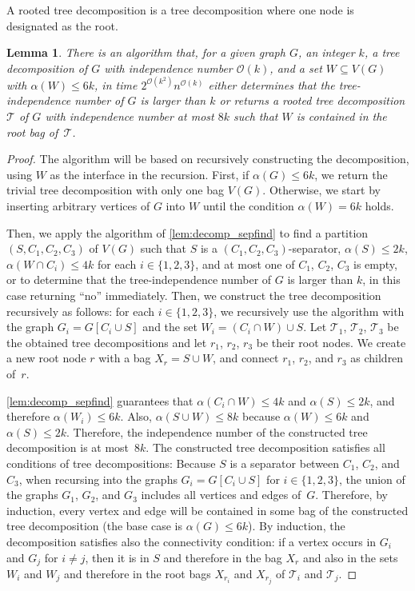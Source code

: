 \documentclass[11pt]{article}
\newtheorem{lemma}{Lemma}[section]
\theoremstyle{definition}
\newcommand{\td}{\mathcal{T}}
\newcommand{\OO}{\mathcal{O}}
\begin{document}
A rooted tree decomposition is a tree decomposition where one node is designated as the root.

\begin{lemma}
\label{lem:maindecompalg}
There is an algorithm that, for a given graph $G$, an integer $k$, a tree decomposition of $G$ with independence number $\OO(k)$, and a set $W \subseteq V(G)$ with $\alpha(W) \le 6k$, in time $2^{\OO(k^2)} n^{\OO(k)}$ either determines that the tree-independence number of $G$ is larger than $k$ or returns a rooted tree decomposition $\td$ of $G$ with independence number at most $8k$ such that $W$ is contained in the root bag of~$\td$.
\end{lemma}
\begin{proof}
The algorithm will be based on recursively constructing the decomposition, using $W$ as the interface in the recursion.
First, if $\alpha(G) \le 6k$, we return the trivial tree decomposition with only one bag $V(G)$.
Otherwise, we start by inserting arbitrary vertices of $G$ into $W$ until the condition $\alpha(W) = 6k$ holds.


Then, we apply the algorithm of \cref{lem:decomp_sepfind} to find a partition $(S, C_1, C_2, C_3)$ of $V(G)$ such that $S$ is a $(C_1, C_2, C_3)$-separator, $\alpha(S) \le 2k$, $\alpha(W \cap C_i) \le 4k$ for each $i \in \{1,2,3\}$, and at most one of $C_1$, $C_2$, $C_3$ is empty, or to determine that the tree-independence number of $G$ is larger than $k$, in this case returning ``no'' immediately.
Then, we construct the tree decomposition recursively as follows: for each $i \in \{1,2,3\}$, we recursively use the algorithm with the graph $G_i = G[C_i \cup S]$ and the set $W_i = (C_i \cap W) \cup S$.
Let $\td_1$, $\td_2$, $\td_3$ be the obtained tree decompositions and let $r_1$, $r_2$, $r_3$ be their root nodes.
We create a new root node $r$ with a bag $X_r = S \cup W$, and connect $r_1$, $r_2$, and $r_3$ as children of~$r$.


\cref{lem:decomp_sepfind} guarantees that $\alpha(C_i \cap W) \le 4k$ and $\alpha(S) \le 2k$, and therefore $\alpha(W_i) \le 6k$.
Also, $\alpha(S \cup W) \le 8k$ because $\alpha(W) \le 6k$ and $\alpha(S) \le 2k$.
Therefore, the  independence number of the constructed tree decomposition  is at most~$8k$.
The constructed  tree decomposition satisfies all conditions of tree decompositions:
Because $S$ is a separator between $C_1$, $C_2$, and $C_3$, when recursing into the graphs $G_i = G[C_i \cup S]$ for $i \in \{1,2,3\}$,  the union of the graphs $G_1$, $G_2$, and $G_3$ includes all vertices and edges of~$G$. Therefore, by induction, every vertex and edge will be contained in some bag of the constructed tree decomposition (the base case is $\alpha(G) \le 6k$).
By induction, the decomposition satisfies also the connectivity condition: if a vertex occurs in $G_i$ and $G_j$ for $i \neq j$, then it is in $S$ and therefore in the bag $X_r$ and also in the sets $W_i$ and $W_j$ and therefore in the root bags $X_{r_i}$ and $X_{r_j}$ of $\td_i$ and $\td_j$.



\end{proof}
\end{document}
